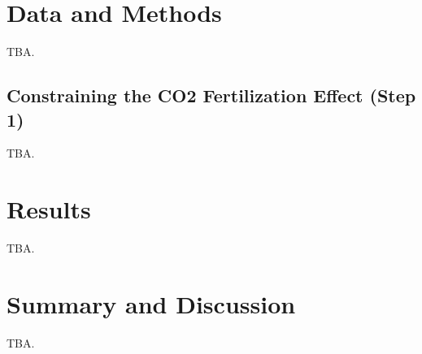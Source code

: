\section{Data and Methods}
\label{sec:06:data_and_methods}

TBA.


\subsection{Constraining the \texorpdfstring{\acs{CO2}}{CO2} Fertilization
  Effect (Step 1)}
\label{subsec:06:step_1}

TBA.


\section{Results}
\label{sec:06:results}

TBA.


\section{Summary and Discussion}
\label{sec:06:summary_and_discussion}

TBA.
